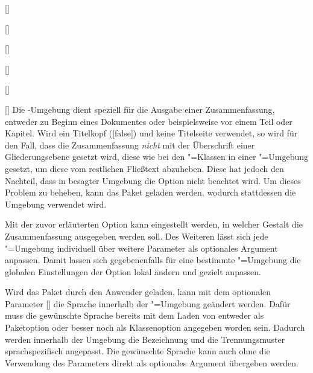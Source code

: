\begin{Declaration}{[]}
\begin{Declaration}[v2.02]{}
\begin{Declaration}{[]}
\begin{Declaration}[v2.02]{%
  []%
}
\begin{Declaration}[v2.02]{%
  []%
}
\begin{Declaration}{[]}
\begin{Declaration}{[\PSet]}{%
}
\printdeclarationlist%
%
%
Die -Umgebung dient speziell für die Ausgabe einer 
Zusammenfassung, entweder zu Beginn eines Dokumentes oder beispielsweise vor 
einem Teil oder Kapitel. Wird ein Titelkopf ([false]) und 
keine Titelseite verwendet, so wird für den Fall, dass die Zusammenfassung 
\emph{nicht} mit der Überschrift einer Gliederungsebene gesetzt wird, diese wie 
bei den \KOMAScript"=Klassen in einer "=Umgebung 
gesetzt, um diese vom restlichen Fließtext abzuheben. Diese hat jedoch den 
Nachteil, dass in besagter Umgebung die Option  nicht beachtet 
wird. Um dieses Problem zu beheben, kann das Paket  geladen 
werden, wodurch stattdessen die Umgebung  verwendet wird.

Mit der zuvor erläuterten Option  kann eingestellt werden, in 
welcher Gestalt die Zusammenfassung ausgegeben werden soll. Des Weiteren lässt 
sich jede "=Umgebung individuell über weitere Parameter 
als optionales Argument anpassen. Damit lassen sich gegebenenfalls für eine 
bestimmte "=Umgebung die globalen Einstellungen 
der Option  lokal ändern und gezielt anpassen. 

Wird das Paket  durch den Anwender geladen, kann mit dem 
optionalen Parameter [] 
die Sprache innerhalb der "=Umgebung geändert werden. 
Dafür muss die gewünschte Sprache bereits mit dem Laden von  
entweder als Paketoption oder besser noch als Klassenoption angegeben worden 
sein. Dadurch werden innerhalb der Umgebung die Bezeichnung  
und die Trennungsmuster sprachspezifisch angepasst. Die gewünschte Sprache kann 
auch ohne die Verwendung des Parameters  
direkt als optionales Argument übergeben werden.


\end{Declaration}
\end{Declaration}
\end{Declaration}
\end{Declaration}
\end{Declaration}
\end{Declaration}
\end{Declaration}
